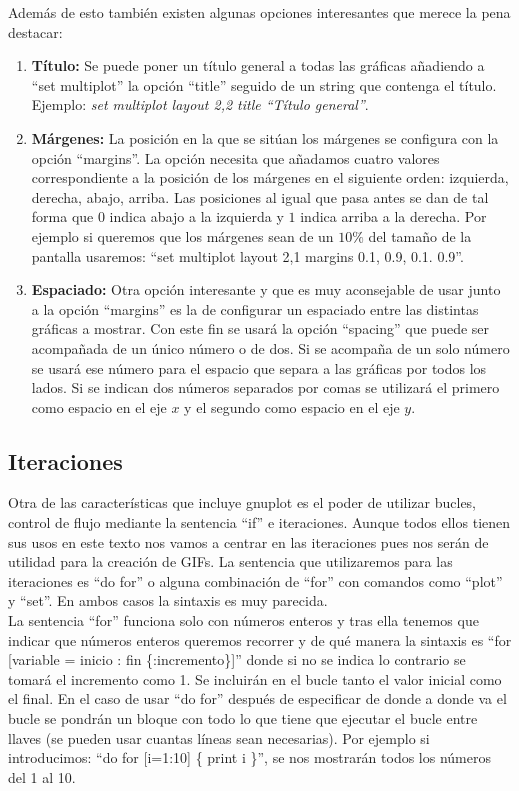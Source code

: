 \documentclass[11pt,a4paper,twoside,pdf]{article}
\numberwithin{equation}{section}
\begin{document}
Además de esto también existen algunas opciones interesantes que merece la pena destacar:

\begin{enumerate}
	\item \textbf{Título:} Se puede poner un título general a todas las gráficas añadiendo a ``set multiplot'' la opción ``title'' seguido de un string que contenga el título. Ejemplo: \textit{set multiplot layout 2,2 title ``Título general''}.
	\item \textbf{Márgenes:} La posición en la que se sitúan los márgenes se configura con la opción ``margins''. La opción necesita que añadamos cuatro valores correspondiente a la posición de los márgenes en el siguiente orden: izquierda, derecha, abajo, arriba. Las posiciones al igual que pasa antes se dan de tal forma que $0$ indica abajo a la izquierda y $1$ indica arriba a la derecha. Por ejemplo si queremos que los márgenes sean de un $10\%$ del tamaño de la pantalla usaremos: ``set multiplot layout 2,1 margins 0.1, 0.9, 0.1. 0.9''.
	\item \textbf{Espaciado:} Otra opción interesante y que es muy aconsejable de usar junto a la opción ``margins'' es la de configurar un espaciado entre las distintas gráficas a mostrar. Con este fin se usará la opción ``spacing'' que puede ser acompañada de un único número o de dos. Si se acompaña de un solo número se usará ese número para el espacio que separa a las gráficas por todos los lados. Si se indican dos números separados por comas se utilizará el primero como espacio en el eje $x$ y el segundo como espacio en el eje $y$.
\end{enumerate}

\subsection{Iteraciones}

Otra de las características que incluye gnuplot es el poder de utilizar bucles, control de flujo mediante la sentencia ``if'' e iteraciones. Aunque todos ellos tienen sus usos en este texto nos vamos a centrar en las iteraciones pues nos serán de utilidad para la creación de GIFs. La sentencia que utilizaremos para las iteraciones es ``do for'' o alguna combinación de ``for'' con comandos como ``plot'' y ``set''. En ambos casos la sintaxis es muy parecida. \\

La sentencia ``for'' funciona solo con números enteros y tras ella tenemos que indicar que números enteros queremos recorrer y de qué manera la sintaxis es ``for [variable = inicio : fin \{:incremento\}]'' donde si no se indica lo contrario se tomará el incremento como 1. Se incluirán en el bucle tanto el valor inicial como el final. En el caso de usar ``do for'' después de especificar de donde a donde va el bucle se pondrán un bloque con todo lo que tiene que ejecutar el bucle entre llaves (se pueden usar cuantas líneas sean necesarias). Por ejemplo si introducimos: ``do for [i=1:10] \{ print i \}'', se nos mostrarán todos los números del 1 al 10. \\
\end{document}
